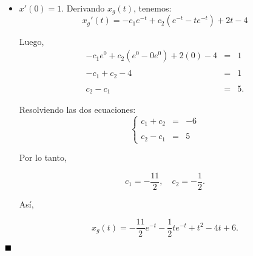 \begin{enumerate}
\begin{multicols}{2}
\begin{itemize}
	    \item $x'(0)=1$.
		Derivando $x_g(t)$, tenemos:
		$$x_g'(t)=-c_1e^{-t}+c_2\left(e^{-t}-te^{-t}\right)+2t-4$$

		Luego, 
		$$
		\begin{array}{rcl}
		    -c_1e^{0}+c_2\left(e^{0}-0e^{0}\right)+2(0)-4&=&1\\\\
		    -c_1+c_2-4&=&1\\\\
		    c_2-c_1&=&5.
		\end{array}
		$$

		Resolviendo las dos ecuaciones:
		$$
		\left\{
		    \begin{array}{rcr}
			c_1+c_2&=&-6\\\\
			c_2-c_1&=&5
		    \end{array}
		\right. 
		$$
		
		Por lo tanto,

		\begin{tcolorbox}
		    $$c_1=-\dfrac{11}{2},\quad c_2=-\dfrac{1}{2}.$$
		\end{tcolorbox}
		Así, 

		\begin{tcolorbox}
		    $$x_g(t)=-\dfrac{11}{2}e^{-t}-\dfrac{1}{2}te^{-t}+ t^2-4t+6.$$
		\end{tcolorbox}

	\end{itemize}
	$\hfill\blacksquare$
	\vspace{.5cm}
    \end{multicols}



\end{enumerate}
